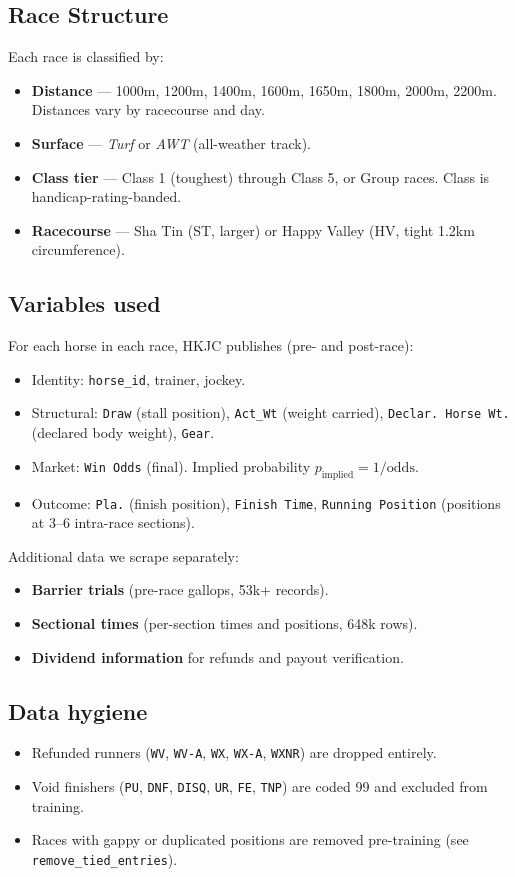 \documentclass[11pt]{article}
\begin{document}
\subsection{Race Structure}
Each race is classified by:
\begin{itemize}\item \textbf{Distance} --- 1000m, 1200m, 1400m, 1600m, 1650m, 1800m,
      2000m, 2200m. Distances vary by racecourse and day.
\item \textbf{Surface} --- \emph{Turf} or \emph{AWT} (all-weather track).
\item \textbf{Class tier} --- Class 1 (toughest) through Class 5, or Group races.
      Class is handicap-rating-banded.
\item \textbf{Racecourse} --- Sha Tin (ST, larger) or Happy Valley (HV,
      tight 1.2km circumference).
\end{itemize}

\subsection{Variables used}
For each horse in each race, HKJC publishes (pre- and post-race):
\begin{itemize}\item Identity: \texttt{horse\_id}, trainer, jockey.
\item Structural: \texttt{Draw} (stall position), \texttt{Act\_Wt} (weight carried),
      \texttt{Declar.\ Horse\ Wt.} (declared body weight), \texttt{Gear}.
\item Market: \texttt{Win Odds} (final). Implied probability
      $p_{\text{implied}} = 1 / \text{odds}$.
\item Outcome: \texttt{Pla.} (finish position), \texttt{Finish Time},
      \texttt{Running Position} (positions at 3--6 intra-race sections).
\end{itemize}

Additional data we scrape separately:
\begin{itemize}\item \textbf{Barrier trials} (pre-race gallops, 53k+ records).
\item \textbf{Sectional times} (per-section times and positions, 648k rows).
\item \textbf{Dividend information} for refunds and payout verification.
\end{itemize}

\subsection{Data hygiene}
\begin{itemize}\item Refunded runners (\texttt{WV}, \texttt{WV-A}, \texttt{WX}, \texttt{WX-A}, \texttt{WXNR})
      are dropped entirely.
\item Void finishers (\texttt{PU}, \texttt{DNF}, \texttt{DISQ}, \texttt{UR}, \texttt{FE}, \texttt{TNP})
      are coded 99 and excluded from training.
\item Races with gappy or duplicated positions are removed pre-training
      (see \texttt{remove\_tied\_entries}).
\end{itemize}
\end{document}
